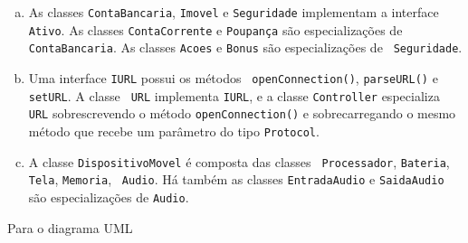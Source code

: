 \begin{enumerate}[a)]
\item As classes {\tt ContaBancaria}, {\tt Imovel} e {\tt Seguridade}
  implementam a interface {\tt Ativo}. As classes {\tt ContaCorrente}
  e {\tt Poupança} são especializações de {\tt ContaBancaria}. As
  classes {\tt Acoes} e {\tt Bonus} são especializações de {\tt
    Seguridade}.

\item Uma interface {\tt IURL} possui os métodos {\tt
    openConnection()}, {\tt parseURL()} e {\tt setURL}. A classe {\tt
    URL} implementa {\tt IURL}, e a classe {\tt Controller}
  especializa {\tt URL} sobrescrevendo o método {\tt openConnection()}
  e sobrecarregando o mesmo método que recebe um parâmetro do tipo
  {\tt Protocol}.

\item A classe {\tt DispositivoMovel} é composta das classes {\tt
    Processador}, {\tt Bateria}, {\tt Tela}, {\tt Memoria}, {\tt
    Audio}. Há também as classes {\tt EntradaAudio} e {\tt SaidaAudio}
  são especializações de {\tt Audio}.
\end{enumerate}


 Para o diagrama UML 

